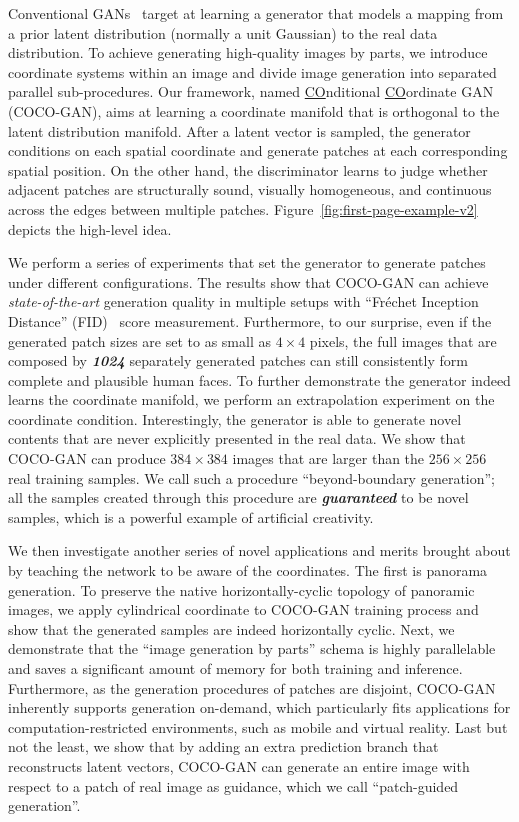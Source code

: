 \documentclass{article}
\newcommand{\modelName}{COCO-GAN }
\begin{document}
Conventional GANs~\cite{GANs} target at learning a generator that models a mapping from a prior latent distribution (normally a unit Gaussian) to the real data distribution. To achieve generating high-quality images by parts, we introduce coordinate systems within an image and divide image generation into separated parallel sub-procedures. Our framework, named \underline{CO}nditional \underline{CO}ordinate GAN (COCO-GAN), aims at learning a coordinate manifold that is orthogonal to the latent distribution manifold. After a latent vector is sampled, the generator conditions on each spatial coordinate and generate patches at each corresponding spatial position. On the other hand, the discriminator learns to judge whether adjacent patches are structurally sound, visually homogeneous, and continuous across the edges between multiple patches. Figure~\ref{fig:first-page-example-v2} depicts the high-level idea.
    


We perform a series of experiments that set the generator to generate patches under different configurations. The results show that \modelName can achieve \emph{state-of-the-art} generation quality in multiple setups with ``Fréchet Inception Distance'' (FID)~\cite{fid} score measurement. Furthermore, to our surprise, even if the generated patch sizes are set to as small as $4\times4$ pixels, the full images that are composed by \textit{\textbf{1024}} separately generated patches can still consistently form complete and plausible human faces. To further demonstrate the generator indeed learns the coordinate manifold, we perform an extrapolation experiment on the coordinate condition. Interestingly, the generator is able to generate novel contents that are never explicitly presented in the real data. We show that \modelName can produce $384\times384$ images that are larger than the $256\times256$ real training samples. We call such a procedure ``beyond-boundary generation''; all the samples created through this procedure are \textbf{\emph{guaranteed}} to be novel samples, which is a powerful example of artificial creativity.
    
We then investigate another series of novel applications and merits brought about by teaching the network to be aware of the coordinates. The first is panorama generation. To preserve the native horizontally-cyclic topology of panoramic images, we apply cylindrical coordinate to \modelName training process and show that the generated samples are indeed horizontally cyclic. Next, we demonstrate that the ``image generation by parts'' schema is highly parallelable and saves a significant amount of memory for both training and inference. Furthermore, as the generation procedures of patches are disjoint, \modelName inherently supports generation on-demand, which particularly fits applications for computation-restricted environments, such as mobile and virtual reality. Last but not the least, we show that by adding an extra prediction branch that reconstructs latent vectors, \modelName can generate an entire image with respect to a patch of real image as guidance, which we call ``patch-guided generation''. 
    
\end{document}
